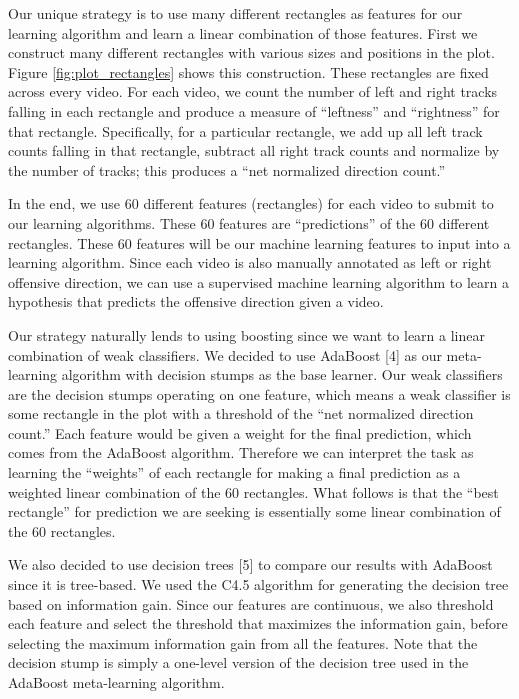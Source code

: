 \documentclass{article} %
\begin{document}
Our unique strategy is to use many different rectangles as features for our learning algorithm and learn a linear combination of those features. First we construct many different rectangles with various sizes and positions in the plot. Figure \ref{fig:plot_rectangles} shows this construction. These rectangles are fixed across every video. For each video, we count the number of left and right tracks falling in each rectangle and produce a measure of ``leftness'' and ``rightness'' for that rectangle. Specifically, for a particular rectangle, we add up all left track counts falling in that rectangle, subtract all right track counts and normalize by the number of tracks; this produces a ``net normalized direction count.''

In the end, we use 60 different features (rectangles) for each video to submit to our learning algorithms. These 60 features are ``predictions'' of the 60 different rectangles. These 60 features will be our machine learning features to input into a learning algorithm. Since each video is also manually annotated as left or right offensive direction, we can use a supervised machine learning algorithm to learn a hypothesis that predicts the offensive direction given a video.

Our strategy naturally lends to using boosting since we want to learn a linear combination of weak classifiers. We decided to use AdaBoost [4] as our meta-learning algorithm with decision stumps as the base learner. Our weak classifiers are the decision stumps operating on one feature, which means a weak classifier is some rectangle in the plot with a threshold of the ``net normalized direction count.'' Each feature would be given a weight for the final prediction, which comes from the AdaBoost algorithm. Therefore we can interpret the task as learning the ``weights'' of each rectangle for making a final prediction as a weighted linear combination of the 60 rectangles. What follows is that the ``best rectangle'' for prediction we are seeking is essentially some linear combination of the 60 rectangles.

We also decided to use decision trees [5] to compare our results with AdaBoost since it is tree-based. We used the C4.5 algorithm for generating the decision tree based on information gain. Since our features are continuous, we also threshold each feature and select the threshold that maximizes the information gain, before selecting the maximum information gain from all the features. Note that the decision stump is simply a one-level version of the decision tree used in the AdaBoost meta-learning algorithm.
\end{document}
